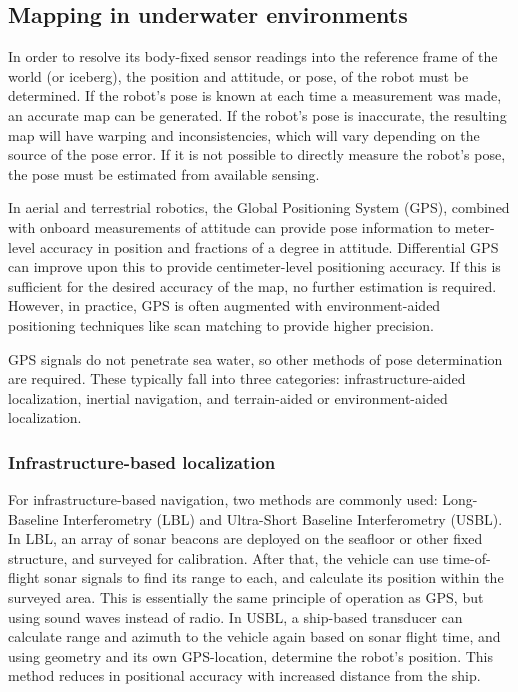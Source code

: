 \subsection{Mapping in underwater environments}

In order to resolve its body-fixed sensor readings into the reference frame of the world (or iceberg), the position and attitude, or pose, of the robot must be determined. If the robot's pose is known at each time a measurement was made, an accurate map can be generated. If the robot's pose is inaccurate, the resulting map will have warping and inconsistencies, which will vary depending on the source of the pose error. If it is not possible to directly measure the robot's pose, the pose must be estimated from available sensing. 

In aerial and terrestrial robotics, the Global Positioning System (GPS), combined with onboard measurements of attitude can provide pose information to meter-level accuracy in position and fractions of a degree in attitude. Differential GPS can improve upon this to provide centimeter-level positioning accuracy. If this is sufficient for the desired accuracy of the map, no further estimation is required. However, in practice, GPS is often augmented with environment-aided positioning techniques like scan matching to provide higher precision. \cite{XXX}

GPS  signals do not penetrate sea water, so other methods of pose determination are required. These typically fall into three categories: infrastructure-aided localization, inertial navigation, and terrain-aided or environment-aided localization. 

\subsubsection{Infrastructure-based localization}

For infrastructure-based navigation, two methods are commonly used: Long-Baseline Interferometry (LBL) and Ultra-Short Baseline Interferometry (USBL). In LBL, an array of sonar beacons are deployed on the seafloor or other fixed structure, and surveyed for calibration. After that, the vehicle can use time-of-flight sonar signals to find its range to each, and calculate its position within the surveyed area. This is essentially the same principle of operation as GPS, but using sound waves instead of radio. In USBL, a ship-based transducer can calculate range and azimuth to the vehicle again based on sonar flight time, and using geometry and its own GPS-location, determine the robot's position. This method reduces in positional accuracy with increased distance from the ship. 


